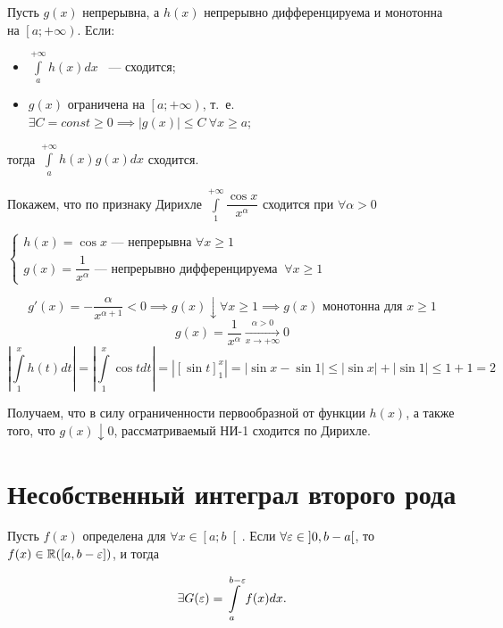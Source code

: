 \documentclass[../../main.tex]{subfiles}
\begin{document}
\begin{thm}
Пусть $g(x)$ непрерывна, а $h(x)$ непрерывно дифференцируема и монотонна на 
$\left[a; +\infty \right)$. Если:
\begin{itemize}
\item[а)] $\displaystyle\int\limits_{a}^{+\infty}h(x)dx$ ~--- сходится;

\item[б)] $g(x)$ ограничена на $\left[a; +\infty\right)$, т.~е. $\exists C = 
const\geq 0 \implies \left| g(x) \right| \leq C \ \forall x \geq a$;
\end{itemize}
тогда $\displaystyle\int\limits_{a}^{+\infty} h(x)g(x)dx$ сходится.
\end{thm}

\begin{exmp}
 Покажем, что по признаку Дирихле
 $\displaystyle\int\limits_{1}^{+\infty}\dfrac{\cos{x}}{x^{\alpha}}$ сходится 
 при 
 $\forall \alpha > 0$
 
 $\begin{cases}
 h(x) = \cos{x} \text{~--- непрерывна } \forall x \geq 1\\
 g(x) = \dfrac{1}{x^{\alpha}} \text{~--- непрерывно дифференцируема }\ \forall 
 x \geq 1
 \end{cases}$
 
 \[g'(x) = -\dfrac{\alpha}{x^{\alpha + 1}} < 0 \implies g(x) \downarrow 
 \forall 
 x \geq 1 \implies g(x) \text{ монотонна для $x \geq 1$}\]
 \[g(x) = \dfrac{1}{x^{\alpha}} \xrightarrow[x \to +\infty]{\alpha > 0} 0\]
 \[\left| \int\limits_{1}^{x}h(t)dt\right| = 
 \left|\int\limits_{1}^{x}\cos{t}dt\right| = \left| \left[ 
 \sin{t}\right]_{1}^{x} \right| = \left| \sin{x} - \sin{1} \right| \leq \left| 
 \sin{x} \right| + \left| \sin{1} \right| \leq 1 + 1 = 2\]

  Получаем, что в силу ограниченности первообразной от функции $h(x)$, а также 
  того, что $g(x) \downarrow 0$, рассматриваемый НИ-1 сходится по Дирихле.
 \end{exmp}
 
 \section{Несобственный интеграл второго рода}
 
 Пусть $f(x)$ определена для $\forall x \in \left[a; b \right[$. Если $\forall 
 \varepsilon \in \left] 0, b - a \right[$, то $f(x) \in \mathbb{R}(\left[a, b - 
 \varepsilon\right])$, и тогда

\begin{equation}\label{lec8:2}
\exists G(\varepsilon) = \displaystyle\int\limits_{a}^{b - \varepsilon}f(x)dx.
\end{equation}
\end{document}
